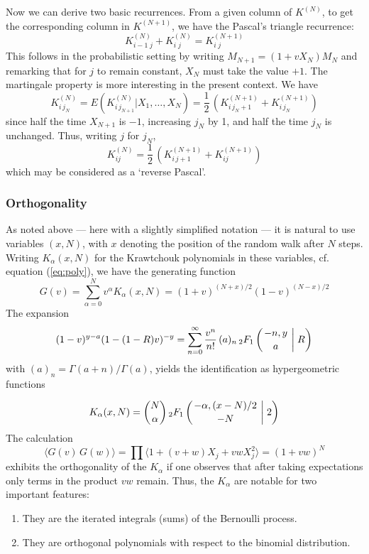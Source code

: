 \documentclass[12pt]{article}
\def\ln{\langle}\def\rn{\rangle}
\def\.#1.#2.{{#1^{#2}}}
\def\kck #1.#2.{ {#1\choose #2} }
\def\tfo #1.#2.#3.#4.{{}_2 F_1\left({#1,#2\atop #3}\biggm| #4 \right)}
\def\pl{polynomial}
\def\ov #1.#2.{{#1\over #2}}
\def\FFF#1#2{K^{(#1)}_{#2}}
\numberwithin{equation}{section}
\begin{document}
Now we can derive two basic recurrences. From a given
column of $K^{(N)}$, to get the corresponding column in 
$K^{(N+1)}$,  we have the Pascal's triangle recurrence:
$$
  \FFF N{i-1\;j} + \FFF N{i  \;j}  =  \FFF {N+1}{i\;j}
$$
This follows in the probabilistic setting by writing
$M_{N+1}=(1+vX_N)M_N$ and remarking that for $j$ to remain constant,
$X_N$ must take the value $+1$. The martingale property is more interesting in the
present context. We have
$$
\FFF N{i\,j_N}= E(\FFF N{i\,j_{N+1}}|X_1,\ldots,X_N)
             =\frac12\,\left(\FFF{N+1}{i\,j_N+1}+\FFF{N+1}{i\,j_N}\right)
$$
since half the time $X_{N+1}$ is $-1$, increasing $j_N$ by 1, and
half the time $j_N$ is unchanged. Thus, writing $j$ for $j_N$,
$$
      \FFF N{ij}=\frac12\,\left(\FFF{N+1}{i\,j+1}+\FFF{N+1}{ij}\right)
$$
which may be considered as a `reverse Pascal'.
\bigskip
\subsubsection{Orthogonality}
As noted above --- here with a slightly simplified notation ---
it is natural to use variables $(x,N)$, with $x$ denoting the
position of the random walk after $N$ steps. Writing $K_{\alpha}(x,N)$ for the
Krawtchouk \pl s in these variables, cf. equation (\ref{eq:poly}), we have  the generating function
$$G(v)=\sum_{\alpha=0}^N \.v.\alpha.K_{\alpha} (x,N) =\.(1+v).(N+x)/2.
             \.(1-v).(N-x)/2.$$
The expansion
\begin{equation}\label{eq:hypergeo}
\.(1-v).y-a.\.(1-(1-R)v).-y.=\sum_{n=0}^\infty
         \ov v^n.n!.\,(a)_n\,\tfo -n.y.a.R. 
\end{equation}
with $(a)_n=\Gamma(a+n)/\Gamma(a)$, yields the identification as hypergeometric functions

$$
K_{\alpha}(x,N)=\kck N.\alpha.\,\tfo-\alpha.(x-N)/2.-N.2.
$$
The calculation
$$\ln G(v)\,G(w)\rn=\prod\ln1+(v+w)X_j+vwX_j^2\rn
                    =(1+vw)^N$$
exhibits the orthogonality of the $K_\alpha$  
if one observes that after taking expectations only terms in the product $vw$ remain.  Thus, the $K_\alpha$ are
notable for two important features:\\
\begin{enumerate}
\item They are the iterated integrals (sums) of the Bernoulli
process.
\item They are orthogonal \pl s with respect to the binomial
distribution.
\end{enumerate}

 
\end{document}
